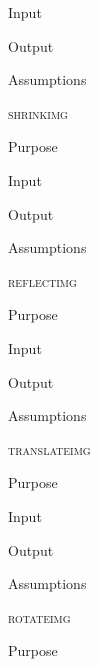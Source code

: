 \documentclass[pdftex, 11pt]{article}
\begin{document}
\begin{description}
\begin{description}
			\item{Input}


			\item{Output}


			\item{Assumptions}


		\end{description}



	\item{\textsc{shrinkimg}}
		\begin{description}
			\item{Purpose}


			\item{Input}


			\item{Output}


			\item{Assumptions}


		\end{description}



	\item{\textsc{reflectimg}}
		\begin{description}
			\item{Purpose}


			\item{Input}


			\item{Output}


			\item{Assumptions}


		\end{description}



	\item{\textsc{translateimg}}
		\begin{description}
			\item{Purpose}


			\item{Input}


			\item{Output}


			\item{Assumptions}


		\end{description}



	\item{\textsc{rotateimg}}
		\begin{description}
			\item{Purpose}



\end{description}
\end{description}
\end{document}
